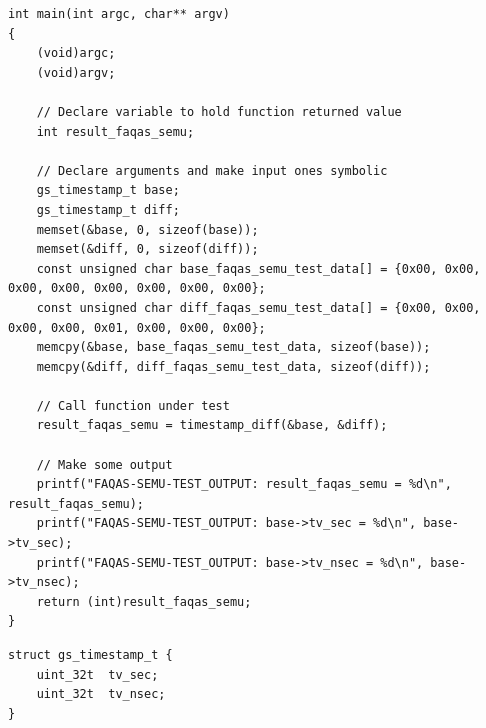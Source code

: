 \begin{lstlisting}[style=CStyle, caption=Test case generated for \UTIL., label=semus:testUtil]
int main(int argc, char** argv)
{
    (void)argc;
    (void)argv;

    // Declare variable to hold function returned value
    int result_faqas_semu;

    // Declare arguments and make input ones symbolic
    gs_timestamp_t base;
    gs_timestamp_t diff;
    memset(&base, 0, sizeof(base));
    memset(&diff, 0, sizeof(diff));
    const unsigned char base_faqas_semu_test_data[] = {0x00, 0x00, 0x00, 0x00, 0x00, 0x00, 0x00, 0x00};
    const unsigned char diff_faqas_semu_test_data[] = {0x00, 0x00, 0x00, 0x00, 0x01, 0x00, 0x00, 0x00};
    memcpy(&base, base_faqas_semu_test_data, sizeof(base));
    memcpy(&diff, diff_faqas_semu_test_data, sizeof(diff));

    // Call function under test
    result_faqas_semu = timestamp_diff(&base, &diff);

    // Make some output
    printf("FAQAS-SEMU-TEST_OUTPUT: result_faqas_semu = %d\n", result_faqas_semu);
    printf("FAQAS-SEMU-TEST_OUTPUT: base->tv_sec = %d\n", base->tv_sec);
    printf("FAQAS-SEMU-TEST_OUTPUT: base->tv_nsec = %d\n", base->tv_nsec);
    return (int)result_faqas_semu;
}
\end{lstlisting}

\begin{lstlisting}[style=CStyle, caption=Definition of \emph{gs\_timestamp\_t} in \UTIL., label=semus:testUtil:struct]
struct gs_timestamp_t {
    uint_32t  tv_sec;
    uint_32t  tv_nsec;
}
\end{lstlisting}

\ENDCHANGEDFINAL